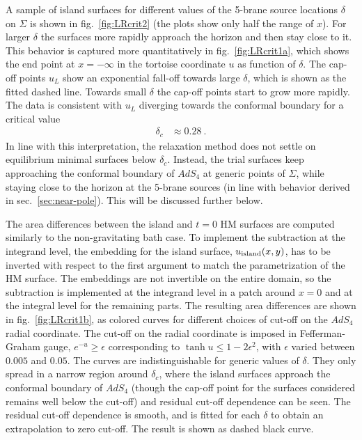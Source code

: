 \documentclass[aps,prd,11pt,notitlepage,longbibliography,nofootinbib,tightenlines,preprintnumbers]{revtex4-1}
\begin{document}
A sample of island surfaces for different values of the 5-brane source locations $\delta$ on $\Sigma$ is shown in fig.~\ref{fig:LRcrit2} (the plots show only half the range of $x$).
For larger $\delta$ the surfaces more rapidly approach the horizon and then stay close to it.
This behavior is captured more quantitatively in fig.~\ref{fig:LRcrit1a}, which shows the end point at $x=-\infty$ in the tortoise coordinate $u$ as function of $\delta$.
The cap-off points $u_L$ show an exponential fall-off towards large $\delta$, which is shown as the fitted dashed line.
Towards small $\delta$ the cap-off points start to grow more rapidly.
The data is consistent with $u_L$ diverging towards the conformal boundary for a critical value
\begin{align}\label{eq:deltac}
	\delta_c&\approx 0.28~.
\end{align}
In line with this interpretation, the relaxation method does not settle on equilibrium minimal surfaces below $\delta_c$.
Instead, the trial surfaces keep approaching the conformal boundary of $AdS_4$ at generic points of $\Sigma$, while staying close to the horizon at the 5-brane sources (in line with behavior derived in sec.~\ref{sec:near-pole}). 
This will be discussed further below.

The area differences between the island and $t=0$ HM surfaces are computed similarly to the non-gravitating bath case. 
To implement the subtraction at the integrand level, the embedding for the island surface, $u_{\rm island}(x,y)$, has to be inverted with respect to the first argument to match the parametrization of the HM surface. The embeddings are not invertible on the entire domain, so the subtraction is implemented at the integrand level in a patch around $x=0$ and at the integral level for the remaining parts.
%
The resulting area differences are shown in fig.~\ref{fig:LRcrit1b}, as colored curves for different choices of cut-off on the $AdS_4$ radial coordinate. The cut-off on the radial coordinate is imposed in Fefferman-Graham gauge, $e^{-u}\geq\epsilon$ corresponding to $\tanh u\leq 1-2\epsilon^2$, with $\epsilon$ varied between $0.005$ and $0.05$.
The curves are indistinguishable for generic values of $\delta$. 
They only spread in a narrow region around $\delta_c$, where the island surfaces approach the conformal boundary of $AdS_4$ (though the cap-off point for the surfaces considered remains well below the cut-off) and residual cut-off dependence can be seen.
The residual cut-off dependence is smooth, and is fitted for each $\delta$ to obtain an extrapolation to zero cut-off.
The result is shown as dashed black curve.
\end{document}
